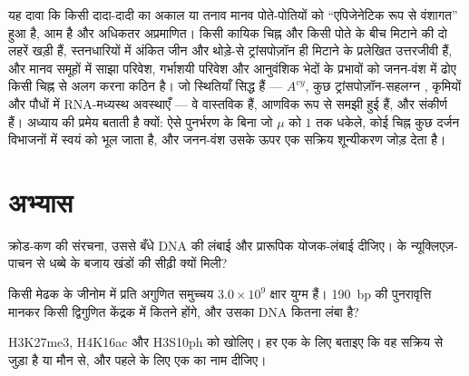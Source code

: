\begin{remark}[पीढ़ी-पार दावों की सीमाएँ]\label{rem:b3:chromatin-epigenetics:limits}
यह दावा कि किसी दादा-दादी का अकाल या तनाव मानव पोते-पोतियों को
``एपिजेनेटिक रूप से वंशागत'' हुआ है, आम है और अधिकतर अप्रमाणित। किसी
कायिक चिह्न और किसी पोते के बीच मिटाने की दो लहरें खड़ी हैं, स्तनधारियों
में अंकित जीन और थोड़े-से ट्रांसपोज़ॉन ही मिटाने के प्रलेखित उत्तरजीवी हैं, और
मानव समूहों में साझा परिवेश, गर्भाशयी परिवेश और आनुवंशिक भेदों के
प्रभावों को जनन-वंश में ढोए किसी चिह्न से अलग करना कठिन है। जो स्थितियाँ
सिद्ध हैं --- $A^{vy}$, कुछ ट्रांसपोज़ॉन-सहलग्न , कृमियों और
पौधों में RNA-मध्यस्थ अवस्थाएँ --- वे वास्तविक हैं, आणविक रूप से समझी
हुई हैं, और संकीर्ण हैं। अध्याय की प्रमेय बताती है क्यों: ऐसे पुनर्भरण
के बिना जो $\mu$ को $1$ तक धकेले, कोई चिह्न कुछ दर्जन विभाजनों में
स्वयं को भूल जाता है, और जनन-वंश उसके ऊपर एक सक्रिय शून्यीकरण जोड़ देता
है।
\end{remark}

\section{अभ्यास}

\begin{exercise}[$\star$]\label{exo:b3:chromatin-epigenetics:1}
 क्रोड-कण की संरचना, उससे बँधे DNA की लंबाई और प्रारूपिक
योजक-लंबाई दीजिए।  के न्यूक्लिएज़-पाचन से धब्बे के बजाय खंडों
की सीढ़ी क्यों मिली?
\end{exercise}

\begin{exercise}[$\star$]\label{exo:b3:chromatin-epigenetics:2}
किसी मेढक के जीनोम में प्रति अगुणित समुच्चय $3.0\times 10^{9}$ क्षार
युग्म हैं। \qty{190}{bp} की पुनरावृत्ति मानकर किसी द्विगुणित केंद्रक
में कितने  होंगे, और उसका DNA कितना लंबा है?
\end{exercise}

\begin{exercise}[$\star$]\label{exo:b3:chromatin-epigenetics:3}
H3K27me3, H4K16ac और H3S10ph को खोलिए। हर एक के लिए बताइए कि वह सक्रिय
 से जुड़ा है या मौन  से, और पहले के लिए एक  का
नाम दीजिए।
\end{exercise}

